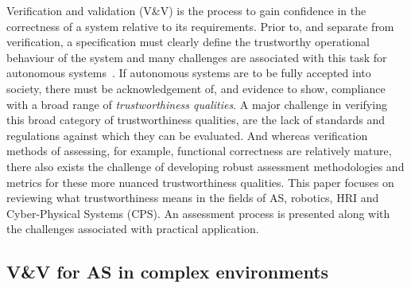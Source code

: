 Verification and validation (V\&V) is the process to gain confidence in the correctness of a system relative to its requirements. Prior to, and separate from verification, a specification must clearly define the trustworthy operational behaviour of the system and many challenges are associated with this task for autonomous systems~\cite{Abeywickrama2022}. 
%
%
If autonomous systems are to be fully accepted into society, there must be acknowledgement of, and evidence to show, compliance with a broad range of \emph{trustworthiness qualities}. 
% 
A major challenge in verifying this broad category of trustworthiness qualities, are the lack of standards and regulations against which they can be evaluated. And whereas verification methods of assessing, for example, functional correctness are relatively mature, there also exists the challenge of developing robust assessment methodologies and metrics for these more nuanced trustworthiness qualities. 
%
%
This paper focuses on reviewing what trustworthiness means in the fields of AS, robotics, HRI and Cyber-Physical Systems (CPS). An assessment process is presented along with the challenges associated with practical application.


\subsection{V\&V for AS in complex environments} 

